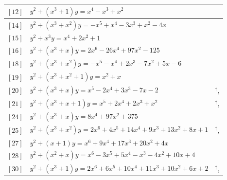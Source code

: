 \documentclass[11pt]{amsart}
\begin{document}
\begin{longtable}{|>{\raggedright\arraybackslash}p{1.7cm}|>{\raggedright\arraybackslash}p{}|>{\raggedright\arraybackslash}p{2.6cm}|}
$[12]$ & \href{https://www.lmfdb.org/Genus2Curve/Q/294/a/294/1}{$y^2 + (x^{3}+1)y = x^{4}-x^{3}+x^{2}$} & \cite{BSSVY}\\ \hline
$[14]$ & \href{https://alpha.lmfdb.org/Genus2Curve/Q/?jump=[[0,-4,1,-3,1,-1],[0,0,1,1]]}{$y^2 + (x^{3}+x^{2})y = -x^{5}+x^{4}-3x^{3}+x^{2}-4x$} & \cite{BookerSutherland}\\ \hline
$[15]$ & \href{https://www.lmfdb.org/Genus2Curve/Q/484/a/1936/1}{$y^2 + x^{3}y = x^{4}+2x^{2}+1$} & \cite{BSSVY}\\ \hline
$[16]$ & \href{https://alpha.lmfdb.org/Genus2Curve/Q/?jump=[[-125,0,97,0,-26,0,2],[0,1,0,1]]}{$y^2 + (x^{3}+x)y = 2x^{6}-26x^{4}+97x^{2}-125$} & \cite{BookerSutherland}\\ \hline
$[18]$ & \href{https://alpha.lmfdb.org/Genus2Curve/Q/?jump=[[-6,5,-7,2,-1,-1],[0,0,1,1]]}{$y^2 + (x^{3}+x^{2})y = -x^{5}-x^{4}+2x^{3}-7x^{2}+5x-6$} & \cite{BookerSutherland}\\ \hline
$[19]$ & \href{https://www.lmfdb.org/Genus2Curve/Q/169/a/169/1}{$y^2 + (x^{3}+x^{2}+1)y = x^{2}+x$} & \cite{MazurTate1973,Ogg1973}\\ \hline
$[20]$ & \href{https://alpha.lmfdb.org/Genus2Curve/Q/?jump=[[-2,-7,0,3,-2,1],[0,1,0,1]]}{$y^2 + (x^{3}+x)y = x^{5}-2x^{4}+3x^{3}-7x-2$} & \cite{HLP2000}$^\dagger$, \cite{BookerSutherland}\\ \hline
$[21]$ & \href{https://www.lmfdb.org/Genus2Curve/Q/324/a/648/1}{$y^2 + (x^{3}+x+1)y = x^{5}+2x^{4}+2x^{3}+x^{2}$} & \cite{Ogg1973}$^\dagger$, \cite{Leprevost1995}\\ \hline
$[24]$ & \href{https://alpha.lmfdb.org/Genus2Curve/Q/?jump=[[375,0,97,0,8],[0,1,0,1]]}{$y^2 + (x^{3}+x)y = 8x^{4}+97x^{2}+375$} & \cite{Leprevost1995}\\ \hline
$[25]$ & \href{https://alpha.lmfdb.org/Genus2Curve/Q/?jump=[[1,8,13,9,14,4,2],[0,0,1,1]]}{$y^2 + (x^{3}+x^{2})y = 2x^{6}+4x^{5}+14x^{4}+9x^{3}+13x^{2}+8x+1$} & \cite{Leprevost1995}$^\dagger$, \cite{PZP2013}\\ \hline
$[27]$ & \href{https://alpha.lmfdb.org/Genus2Curve/Q/?jump=[[0,4,20,17,9,0,1],[1,1]]}{$y^2 + (x+1)y = x^{6}+9x^{4}+17x^{3}+20x^{2}+4x$} & \cite{Leprevost1995}\\ \hline
$[28]$ & \href{https://alpha.lmfdb.org/Genus2Curve/Q/?jump=[[4,10,-4,-1,5,-3,1],[0,1,1]]}{$y^2 + (x^{2}+x)y = x^{6}-3x^{5}+5x^{4}-x^{3}-4x^{2}+10x+4$} & \cite{Howe2015}\\ \hline
$[30]$ & \href{https://alpha.lmfdb.org/Genus2Curve/Q/?jump=[[2,6,10,11,10,6,2],[1,0,0,1]]}{$y^2 + (x^{3}+1)y = 2x^{6}+6x^{5}+10x^{4}+11x^{3}+10x^{2}+6x+2$} & \cite{HLP2000}$^\dagger$, \cite{BookerSutherland}\\ \hline

\end{longtable}
\end{document}

